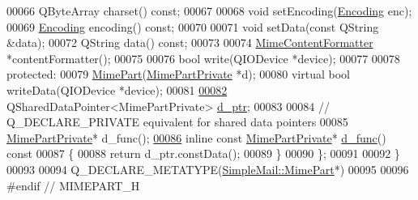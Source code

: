 \begin{DoxyCode}
00066     QByteArray charset() \textcolor{keyword}{const};
00067 
00068     \textcolor{keywordtype}{void} setEncoding(\hyperlink{class_simple_mail_1_1_mime_part_ae67a2f5406958b95b18bf31a7bbeb5c9}{Encoding} enc);
00069     \hyperlink{class_simple_mail_1_1_mime_part_ae67a2f5406958b95b18bf31a7bbeb5c9}{Encoding} encoding() \textcolor{keyword}{const};
00070 
00071     \textcolor{keywordtype}{void} setData(\textcolor{keyword}{const} QString &data);
00072     QString data() \textcolor{keyword}{const};
00073 
00074     \hyperlink{class_simple_mail_1_1_mime_content_formatter}{MimeContentFormatter} *contentFormatter();
00075 
00076     \textcolor{keywordtype}{bool} write(QIODevice *device);
00077 
00078 \textcolor{keyword}{protected}:
00079     \hyperlink{class_simple_mail_1_1_mime_part}{MimePart}(\hyperlink{class_simple_mail_1_1_mime_part_private}{MimePartPrivate} *d);
00080     \textcolor{keyword}{virtual} \textcolor{keywordtype}{bool} writeData(QIODevice *device);
00081 
\hyperlink{class_simple_mail_1_1_mime_part_a6adc00256ce96a9282f2ec0224625b0b}{00082}     QSharedDataPointer<MimePartPrivate> \hyperlink{class_simple_mail_1_1_mime_part_a6adc00256ce96a9282f2ec0224625b0b}{d\_ptr};
00083 
00084     \textcolor{comment}{// Q\_DECLARE\_PRIVATE equivalent for shared data pointers}
00085     \hyperlink{class_simple_mail_1_1_mime_part_private}{MimePartPrivate}* d\_func();
\hyperlink{class_simple_mail_1_1_mime_part_a5ae5c144f7a80afd6b5ef36512baf67a}{00086}     \textcolor{keyword}{inline} \textcolor{keyword}{const} \hyperlink{class_simple_mail_1_1_mime_part_private}{MimePartPrivate}* \hyperlink{class_simple_mail_1_1_mime_part_a5ae5c144f7a80afd6b5ef36512baf67a}{d\_func}()\textcolor{keyword}{ const}
00087 \textcolor{keyword}{    }\{
00088         \textcolor{keywordflow}{return} d\_ptr.constData();
00089     \}
00090 \};
00091 
00092 \}
00093 
00094 Q\_DECLARE\_METATYPE(\hyperlink{class_simple_mail_1_1_mime_part}{SimpleMail::MimePart}*)
00095 
00096 \textcolor{preprocessor}{#endif // MIMEPART\_H}
\end{DoxyCode}
